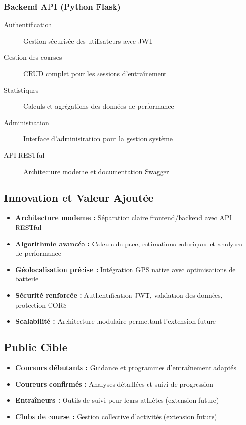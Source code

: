 \subsubsection{Backend API (Python Flask)}

\begin{description}
    \item[Authentification] Gestion sécurisée des utilisateurs avec JWT
    \item[Gestion des courses] CRUD complet pour les sessions d'entraînement
    \item[Statistiques] Calculs et agrégations des données de performance
    \item[Administration] Interface d'administration pour la gestion système
    \item[API RESTful] Architecture moderne et documentation Swagger
\end{description}

\subsection{Innovation et Valeur Ajoutée}

\begin{itemize}
    \item \textbf{Architecture moderne :} Séparation claire frontend/backend avec API RESTful
    \item \textbf{Algorithmie avancée :} Calculs de pace, estimations caloriques et analyses de performance
    \item \textbf{Géolocalisation précise :} Intégration GPS native avec optimisations de batterie
    \item \textbf{Sécurité renforcée :} Authentification JWT, validation des données, protection CORS
    \item \textbf{Scalabilité :} Architecture modulaire permettant l'extension future
\end{itemize}

\subsection{Public Cible}

\begin{itemize}
    \item \textbf{Coureurs débutants :} Guidance et programmes d'entraînement adaptés
    \item \textbf{Coureurs confirmés :} Analyses détaillées et suivi de progression
    \item \textbf{Entraîneurs :} Outils de suivi pour leurs athlètes (extension future)
    \item \textbf{Clubs de course :} Gestion collective d'activités (extension future)
\end{itemize}

